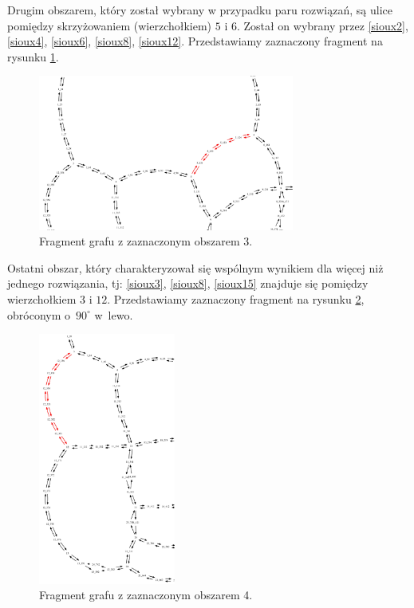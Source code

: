 \documentclass[twoside,12pt]{report}
\begin{document}
Drugim obszarem, który został wybrany w przypadku paru rozwiązań, są ulice pomiędzy skrzyżowaniem (wierzchołkiem) $5$ i $6$. Został on wybrany przez \ref{sioux2}, \ref{sioux4}, \ref{sioux6}, \ref{sioux8}, \ref{sioux12}. Przedstawiamy zaznaczony fragment na rysunku \ref{frag_3}.

\begin{figure}[ht]
\centering
\includegraphics[width=0.75\textwidth]{img/sioux-out/obszar3}
\caption{Fragment grafu z zaznaczonym obszarem 3.}
\label{frag_3}
\end{figure}

Ostatni obszar, który charakteryzował się wspólnym wynikiem dla więcej niż jednego rozwiązania, tj: \ref{sioux3}, \ref{sioux8}, \ref{sioux15} znajduje się pomiędzy wierzchołkiem $3$ i $12$. Przedstawiamy zaznaczony fragment na rysunku \ref{frag_4}, obróconym o~$90^{\circ}$ w~lewo.

\begin{figure}[ht]
\centering
\includegraphics[width=0.4\textwidth, angle=90]{img/sioux-out/obszar4}
\caption{Fragment grafu z zaznaczonym obszarem 4.}
\label{frag_4}
\end{figure}
\end{document}
